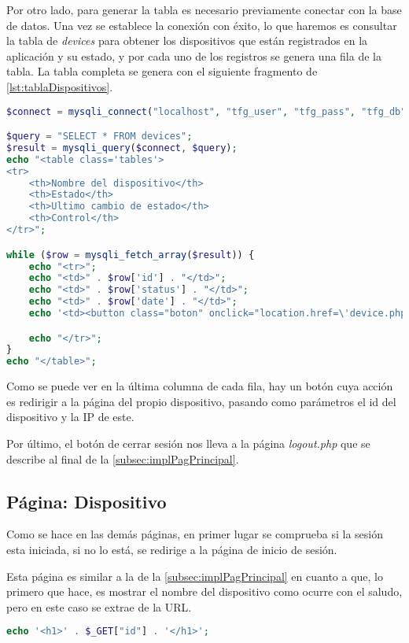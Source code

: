 Por otro lado, para generar la tabla es necesario previamente conectar con la base de datos. Una vez se establece la conexión con éxito, lo que haremos es consultar la tabla de \textit{devices} para obtener los dispositivos que están registrados en la aplicación y su estado, y por cada uno de los registros se genera una fila de la tabla. La tabla completa se genera con el siguiente fragmento de \autoref{lst:tablaDispositivos}.
\begin{lstlisting}[language=PHP, caption=Visualización de tabla de dispositivos, label=lst:tablaDispositivos]
$connect = mysqli_connect("localhost", "tfg_user", "tfg_pass", "tfg_db");

$query = "SELECT * FROM devices";
$result = mysqli_query($connect, $query);
echo "<table class='tables'>
<tr>
    <th>Nombre del dispositivo</th>
    <th>Estado</th>
    <th>Ultimo cambio de estado</th>
    <th>Control</th>
</tr>";

while ($row = mysqli_fetch_array($result)) {
    echo "<tr>";
    echo "<td>" . $row['id'] . "</td>";
    echo "<td>" . $row['status'] . "</td>";
    echo "<td>" . $row['date'] . "</td>";
    echo '<td><button class="boton" onclick="location.href=\'device.php?id=' . $row['id'] . '&ip=' . $row['ip'] . '\'">Acceder</button></td>';

    echo "</tr>";
}
echo "</table>";
\end{lstlisting}

Como se puede ver en la última columna de cada fila, hay un botón cuya acción es redirigir a la página del propio dispositivo, pasando como parámetros el id del dispositivo y la IP de este.

Por último, el botón de cerrar sesión nos lleva a la página \textit{logout.php} que se describe al final de la \autoref{subsec:implPagPrincipal}.

\subsection{Página: Dispositivo}
Como se hace en las demás páginas, en primer lugar se comprueba si la sesión esta iniciada, si no lo está, se redirige a la página de inicio de sesión. 

Esta página es similar a la de la \autoref{subsec:implPagPrincipal} en cuanto a que, lo primero que hace, es mostrar el nombre del dispositivo como ocurre con el saludo, pero en este caso se extrae de la URL.
\begin{lstlisting}[language=PHP, caption=Nombre del dispositivo en la cabecera de la página, label=lst:nombreDispositivo]
echo '<h1>' . $_GET["id"] . '</h1>';
\end{lstlisting}

